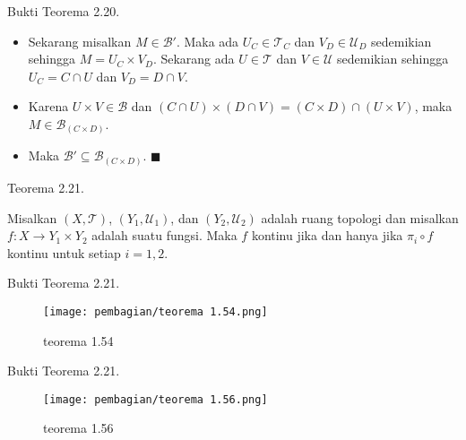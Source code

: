     \begin{frame}{Bukti Teorema 2.20.}
    \begin{tcolorbox}[title=Bukti Teorema 2.20 (3/3)]
    \begin{itemize}
        \item Sekarang misalkan $M \in \mathcal{B}'$. Maka ada $U_C \in \mathcal{T}_C$ dan $V_D \in \mathcal{U}_D$ sedemikian sehingga $M = U_C \times V_D$. Sekarang ada $U \in \mathcal{T}$ dan $V \in \mathcal{U}$ sedemikian sehingga $U_C = C \cap U$ dan $V_D = D \cap V$. 
        \item Karena $U \times V \in \mathcal{B}$ dan $(C \cap U) \times (D \cap V) = (C \times D) \cap (U \times V)$, maka $M \in \mathcal{B}_{(C \times D)}$. 
        \item Maka $\mathcal{B}' \subseteq \mathcal{B}_{(C \times D)}$. \(\blacksquare\)
    \end{itemize}
    
    \end{tcolorbox}
    \end{frame}
    
    \begin{frame}{Teorema 2.21.}
    \begin{tcolorbox}[title=Teorema 2.21]
        Misalkan \((X, \mathcal{T})\), \((Y_1, \mathcal{U}_1)\), dan \((Y_2, \mathcal{U}_2)\) adalah ruang topologi dan misalkan \(f : X \rightarrow Y_1 \times Y_2\) adalah suatu fungsi. Maka \(f\) kontinu jika dan hanya jika \(\pi_i \circ f\) kontinu untuk setiap \(i = 1, 2\).
    
    \end{tcolorbox}
    \end{frame}
    
    \begin{frame}{Bukti Teorema 2.21.}
    \begin{figure}
        \centering
        \texttt{[image: pembagian/teorema 1.54.png]}
        \caption{teorema 1.54}
        \label{fig:enter-label}
    \end{figure}
    \end{frame}
    
    \begin{frame}{Bukti Teorema 2.21.}
    \begin{figure}
        \centering
        \texttt{[image: pembagian/teorema 1.56.png]}
        \caption{teorema 1.56}
        \label{fig:enter-label}
    \end{figure}
    \end{frame}
    
